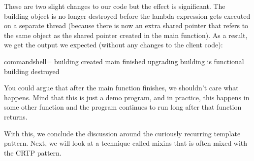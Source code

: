 These are two slight changes to our code but the effect is significant. The building object is no longer destroyed before the lambda expression gets executed on a separate thread (because there is now an extra shared pointer that refers to the same object as the shared pointer created in the main function). As a result, we get the output we expected (without any changes to the client code):

\begin{tcblisting}{commandshell={}}
building created
main finished
upgrading
building is functional
building destroyed
\end{tcblisting}

You could argue that after the main function finishes, we shouldn’t care what happens. Mind that this is just a demo program, and in practice, this happens in some other function and the program continues to run long after that function returns.

With this, we conclude the discussion around the curiously recurring template pattern. Next, we will look at a technique called mixins that is often mixed with the CRTP pattern.





















